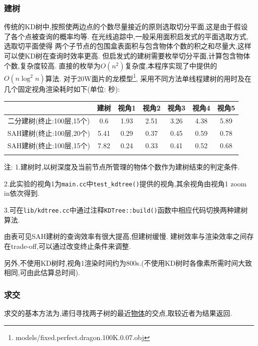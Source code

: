 \subsubsection{建树}
传统的KD树中,按照使两边点的个数尽量接近的原则选取切分平面,这是由于假设了各个点被查询的概率均等.
在光线追踪中,一般采用面积启发式的平面选取方式\cite{kdtree},选取切平面使得
两个子节点的包围盒表面积与包含物体个数的积之和尽量大,这样可以使KD树在查询时效率更高.
但启发式的建树需要枚举切分平面,计算包含物体个数,复杂度较高.
直接的枚举为$ O(n^2)$复杂度,本程序实现了\cite{kdtree}中提供的$ O(n \log^2 n)$算法.
对于20W面片的龙模型\footnote{models/fixed.perfect.dragon.100K.0.07.obj},
采用不同方法单线程建树的用时及在几个固定视角渲染耗时如下(单位: 秒):

\begin{table}[H]
  \begin{threeparttable}

    \begin{tabular}{c|c|c|c|c|c|c}
      \shline
      & 建树 & 视角1 & 视角2 & 视角3 & 视角4 & 视角5 \\ \hline
      二分建树(终止:100层,15个)  & 0.6  & 1.93  & 2.51  & 3.26  & 4.38  & 5.89  \\ \hline
      SAH建树(终止:100层,20个) & 5.41 & 0.29  & 0.37  & 0.45  & 0.59  & 0.78    \\ \hline
      SAH建树(终止:100层,15个) & 7.82 & 0.24  & 0.33  & 0.41  & 0.52  & 0.68    \\ \shline
    \end{tabular}
    \begin{tablenotes}
      \footnotesize
    \item 注: 1.建树时,以树深度及当前节点所管理的物体个数作为建树结束的判定条件.
    \item 2.此实验的视角1为\verb|main.cc|中\verb|test_kdtree()|提供的视角,其余视角由视角1 zoom in依次得到.
    \item 3.可在\verb|lib/kdtree.cc|中通过注释\verb|KDTree::build()|函数中相应代码切换两种建树算法.
    \end{tablenotes}
  \end{threeparttable}
\end{table}

由表可见SAH建树的查询效率有很大提高,但建树缓慢. 建树效率与渲染效率之间存在trade-off,可以通过改变终止条件来调整.

另外,不使用KD树时,视角1渲染时间约为800s.(不使用KD树时各像素所需时间大致相同,可由此估算总时间).

\subsubsection{求交}
求交的基本方法为,递归寻找两子树的最近\underline{物体}的交点,取较近者为结果返回.

